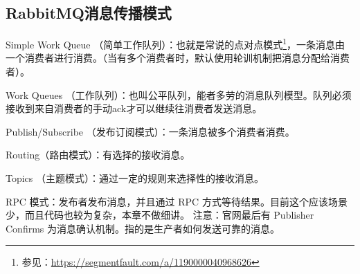 \documentclass[../../../interview-questions.tex]{subfiles}
\begin{document}
\subsection{RabbitMQ消息传播模式}

Simple Work Queue （简单工作队列）：也就是常说的点对点模式\footnote{参见：\url{https://segmentfault.com/a/1190000040968626}}，一条消息由一个消费者进行消费。（当有多个消费者时，默认使用轮训机制把消息分配给消费者）。

Work Queues （工作队列）：也叫公平队列，能者多劳的消息队列模型。队列必须接收到来自消费者的手动ack才可以继续往消费者发送消息。

Publish/Subscribe （发布订阅模式）：一条消息被多个消费者消费。

Routing（路由模式）：有选择的接收消息。

Topics （主题模式）：通过一定的规则来选择性的接收消息。

RPC 模式：发布者发布消息，并且通过 RPC 方式等待结果。目前这个应该场景少，而且代码也较为复杂，本章不做细讲。
注意：官网最后有 Publisher Confirms 为消息确认机制。指的是生产者如何发送可靠的消息。
\end{document}
